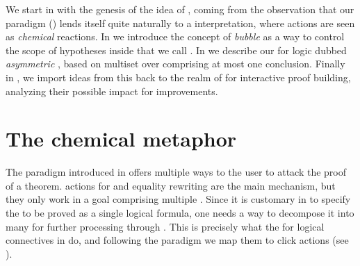 \begin{scope}
We start in  with the genesis of the idea of , coming from the observation that our  paradigm
() lends itself quite naturally to a 
interpretation, where actions are seen as \emph{chemical} reactions. In
 we introduce the concept of \emph{bubble} as a way to control
the scope of hypotheses inside  that we call
\emph{}. In  we describe our  for
 logic dubbed \emph{asymmetric }, based
on multiset  over  comprising at most one
conclusion. Finally in , we import ideas from this
 back to the realm of  for interactive proof
building, analyzing their possible impact for  improvements.

\section{The chemical metaphor}

The  paradigm introduced in  offers multiple ways to
the user to attack the proof of a theorem.  actions for 
and equality rewriting are the main mechanism, but they only work in a goal
comprising multiple . Since it is customary in  to specify
the  to be proved as a single logical formula, one needs a way to decompose
it into many  for further processing through . This is precisely what
the  for logical connectives in  do, and
following the  paradigm \cite{PbP} we map them to click
actions (see ).


\end{scope}
